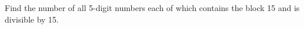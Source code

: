 \item Find the number of all 5-digit numbers each of which contains the block 15 and is divisible by 15.
 